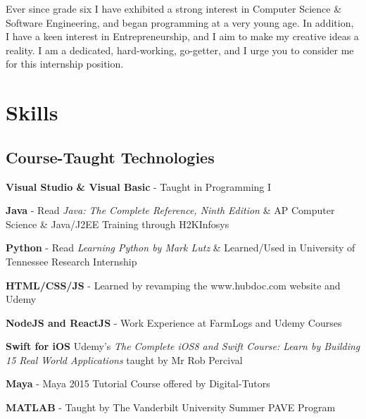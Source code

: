 \documentclass[letterpaper]{deedy-resume} %
\begin{document}
\hfill
%
%
\begin{minipage}[t]{0.66\textwidth} %


Ever since grade six I have exhibited a strong interest in Computer
Science \& Software Engineering, and began programming at a very young age. In addition, I have a keen interest in Entrepreneurship, and I aim to make my creative ideas a reality. I am a dedicated, hard-working, go-getter, and I urge you to consider me for this internship position.



\section{Skills}

\subsection{Course-Taught Technologies}

\vspace{\topsep} %

\begin{tightitemize}

	\item \textbf{Visual Studio \& Visual Basic} - Taught in Programming I
    \item \textbf{Java} - Read \textit{Java: The Complete Reference, Ninth Edition} \& AP Computer Science \& Java/J2EE Training through H2KInfosys
    \item \textbf{Python} - Read \textit{Learning Python by Mark Lutz} \& Learned/Used in University of Tennessee Research Internship
    \item \textbf{HTML/CSS/JS} - Learned by revamping the www.hubdoc.com website and Udemy
    \item \textbf{NodeJS and ReactJS} - Work Experience at FarmLogs and Udemy Courses
    \item \textbf{Swift for iOS} Udemy's \textit{The Complete iOS8 and Swift Course: Learn by Building 15 Real World Applications} taught by Mr Rob Percival
    \item \textbf{Maya} - Maya 2015 Tutorial Course offered by Digital-Tutors
    \item \textbf{MATLAB} - Taught by The Vanderbilt University Summer PAVE Program
    

\end{tightitemize}
\end{minipage}
\end{document}
